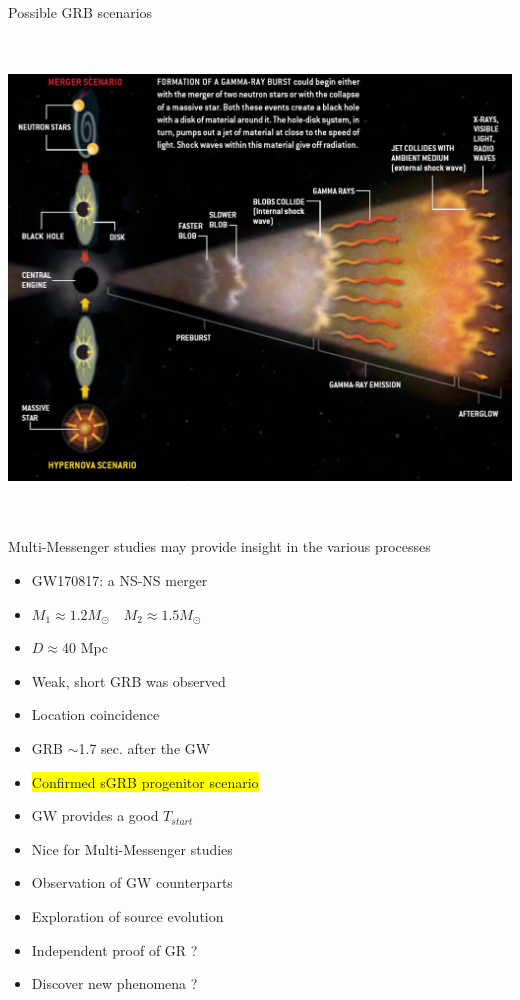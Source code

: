 \Tr
\onecolumn
\begin{center}
{\blue Possible GRB scenarios}\\[3mm]
\includegraphics[keepaspectratio,height=13.5cm]{GRB-phases2}\\[2mm]
{\red Multi-Messenger studies may provide insight in the various processes} 
\end{center}

\Tr
\twocolumn
\begin{itemize}
\item GW170817: a NS-NS merger
\item[] $M_{1} \approx 1.2M_{\odot} \quad M_{2} \approx 1.5M_{\odot}$
\item[] $D \approx 40$ Mpc
\item Weak, short GRB was observed
\item[] Location coincidence
\item[] GRB $\sim$1.7 sec. after the GW
\item[] \colorbox{yellow}{Confirmed sGRB progenitor scenario}
\item GW provides a good $T_{start}$
\item[] Nice for Multi-Messenger studies
\item Observation of GW counterparts
\item[] Exploration of source evolution
\item[] Independent proof of GR ?
\item[] Discover new phenomena ?
\end{itemize}

